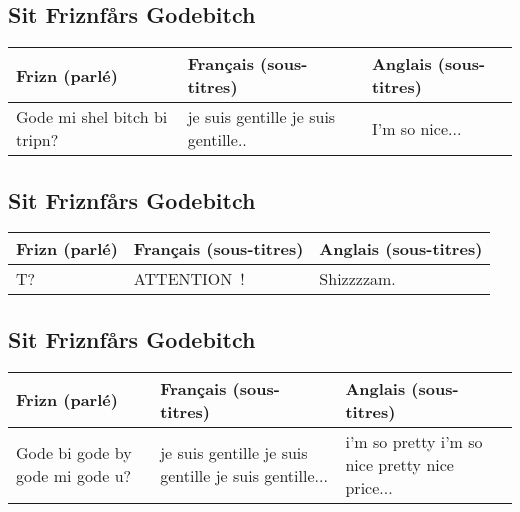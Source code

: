 \documentclass[a4paper]{article}
\begin{document}
\subsection*{Sit Friznfårs Godebitch}
\begin{center}
\begin{tabular}{|p{}|p{}|p{}|}\hline
Frizn (parlé) & Français (sous-titres) & Anglais (sous-titres) \\\hline
Gode mi shel bitch bi tripn? &
je suis gentille je suis gentille.. &
I'm so nice... \\\hline
\end{tabular}
\end{center}\par
\subsection*{Sit Friznfårs Godebitch}
\begin{center}
\begin{tabular}{|p{}|p{}|p{}|}\hline
Frizn (parlé) & Français (sous-titres) & Anglais (sous-titres) \\\hline
T? &
ATTENTION~! &
Shizzzzam. \\\hline
\end{tabular}
\end{center}\par
\subsection*{Sit Friznfårs Godebitch}
\begin{center}
\begin{tabular}{|p{}|p{}|p{}|}\hline
Frizn (parlé) & Français (sous-titres) & Anglais (sous-titres) \\\hline
Gode bi gode by gode mi gode u? &
je suis gentille je suis gentille je suis gentille... &
i'm so pretty i'm so nice pretty nice price...  \\\hline
\end{tabular}
\end{center}\par
\end{document}
